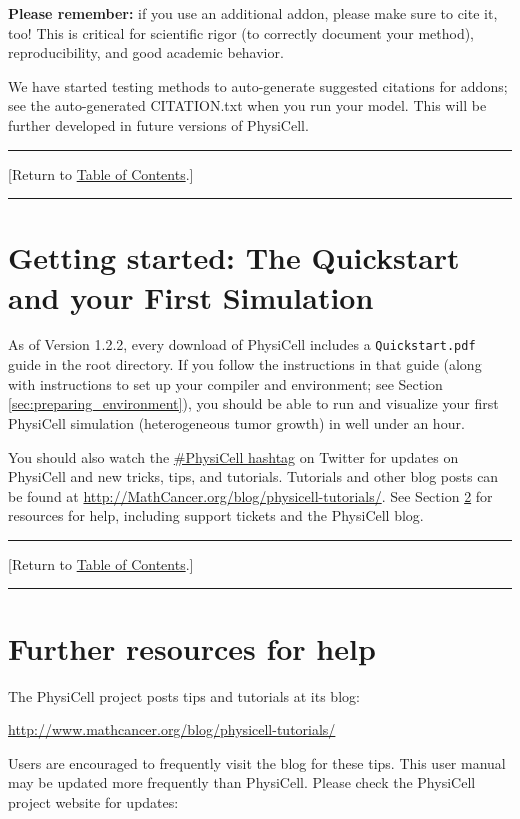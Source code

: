 \documentclass[12pt]{article}
\renewcommand{\v}{\verb}
\newcommand{\TOClink}{\begin{center}\hrule\vskip-5pt\phantom{.}\hfill[Return to \hyperlink{TOC}{Table of Contents}.]\hfill\phantom{.}\vskip3pt\hrule\end{center}}
\begin{document}
\textbf{Please remember:} if you use an additional addon, please make sure to cite it, too! This is critical for scientific rigor (to correctly document your method), reproducibility, and good academic behavior. 

We have started testing methods to auto-generate suggested citations for addons; see the auto-generated CITATION.txt when you run your model. This will be further developed in future versions of PhysiCell.  

\TOClink

\section{Getting started: The Quickstart and your First Simulation}
\label{sec:getting_started}
As of Version 1.2.2, every download of PhysiCell includes a \v|Quickstart.pdf| guide in the root 
directory. If you follow the instructions in that guide (along with instructions to 
set up your compiler and environment; see Section \ref{sec:preparing_environment}), you should 
be able to run and visualize your first PhysiCell simulation (heterogeneous tumor growth) 
in well under an hour. 

You should also watch the \href{https://twitter.com/search?f=tweets&vertical=default&q=PhysiCell&src=typd}{\#PhysiCell hashtag} 
on Twitter for updates on PhysiCell and new tricks, tips, and tutorials. 
Tutorials and other blog posts can be found at 
\href{http://mathcancer.org/blog/physicell-tutorials/}{http://MathCancer.org/blog/physicell-tutorials/}. 
See Section \ref{sec:blog_and_help} for resources for help, including support tickets and the PhysiCell blog. 

\TOClink 

\section{Further resources for help}
\label{sec:blog_and_help}
The PhysiCell project posts tips and tutorials at its blog: 

\begin{center}
\href{http://www.mathcancer.org/blog/physicell-tutorials/}{http://www.mathcancer.org/blog/physicell-tutorials/}
\end{center}

Users are encouraged to frequently visit the blog for these tips. This user manual may 
be updated more frequently than PhysiCell. Please check the PhysiCell project website for 
updates: 
\end{document}
